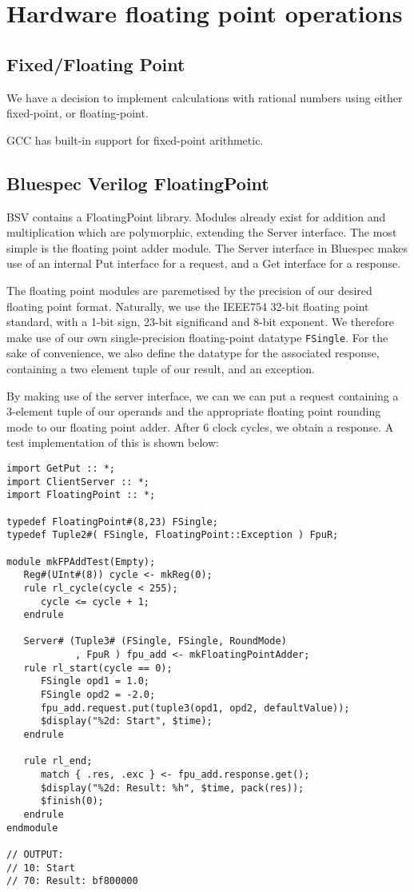 \documentclass[a4paper,8pt]{report}
\begin{document}
\section{Hardware floating point operations}
\subsection{Fixed/Floating Point}
We have a decision to implement calculations with rational numbers using either
fixed-point, or floating-point.

GCC has built-in support for fixed-point arithmetic.

\subsection{Bluespec Verilog FloatingPoint}
BSV contains a FloatingPoint library. Modules already exist for addition and
multiplication which are polymorphic, extending the Server interface. The most
simple is the floating point adder module. The Server interface in Bluespec
makes use of an internal Put interface for a request, and a Get interface for a
response.

The floating point modules are paremetised by the precision of our desired floating
point format. Naturally, we use the IEEE754 32-bit floating point standard, with a 1-bit sign,
23-bit significand and 8-bit exponent. We therefore make use of our own
single-precision floating-point datatype \texttt{FSingle}. For the sake of
convenience, we also define the datatype for the associated response, containing
a two element tuple of our result, and an exception.

By making use of the server interface, we can we can put a request containing a
3-element tuple of our operands and the appropriate floating point rounding mode
to our floating point adder. After 6 clock cycles, we obtain a response. A test
implementation of this is shown below: \\

\tiny
\begin{verbatim}
import GetPut :: *;
import ClientServer :: *;
import FloatingPoint :: *;

typedef FloatingPoint#(8,23) FSingle;
typedef Tuple2#( FSingle, FloatingPoint::Exception ) FpuR;

module mkFPAddTest(Empty);
   Reg#(UInt#(8)) cycle <- mkReg(0);
   rule rl_cycle(cycle < 255);
      cycle <= cycle + 1;
   endrule

   Server# (Tuple3# (FSingle, FSingle, RoundMode)
            , FpuR ) fpu_add <- mkFloatingPointAdder;
   rule rl_start(cycle == 0);
      FSingle opd1 = 1.0;
      FSingle opd2 = -2.0;
      fpu_add.request.put(tuple3(opd1, opd2, defaultValue));
      $display("%2d: Start", $time);
   endrule

   rule rl_end;
      match { .res, .exc } <- fpu_add.response.get();
      $display("%2d: Result: %h", $time, pack(res)); 
      $finish(0);
   endrule
endmodule

// OUTPUT:
// 10: Start
// 70: Result: bf800000
\end{verbatim}
\normalsize
\end{document}
